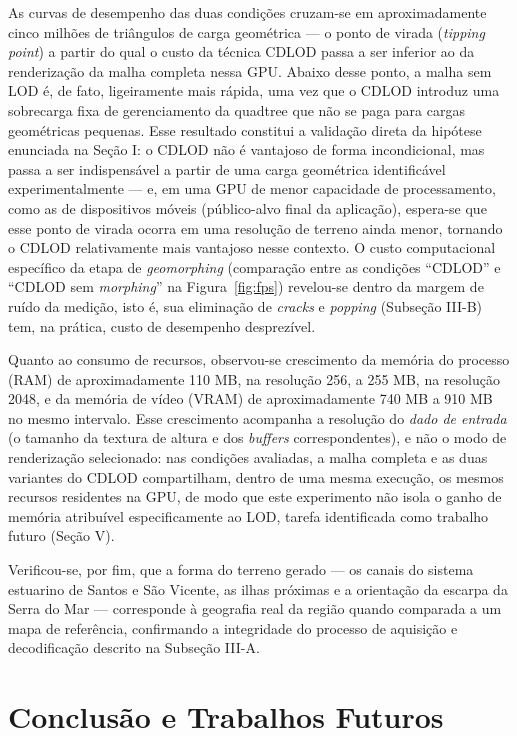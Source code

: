 \documentclass[conference]{IEEEtran}
\begin{document}
As curvas de desempenho das duas condições cruzam-se em aproximadamente
cinco milhões de triângulos de carga geométrica --- o ponto de virada
(\emph{tipping point}) a partir do qual o custo da técnica CDLOD passa a
ser inferior ao da renderização da malha completa nessa GPU. Abaixo desse
ponto, a malha sem LOD é, de fato, ligeiramente mais rápida, uma vez que
o CDLOD introduz uma sobrecarga fixa de gerenciamento da quadtree que não
se paga para cargas geométricas pequenas. Esse resultado constitui a
validação direta da hipótese enunciada na Seção I: o CDLOD não é
vantajoso de forma incondicional, mas passa a ser indispensável a partir
de uma carga geométrica identificável experimentalmente --- e, em uma GPU
de menor capacidade de processamento, como as de dispositivos móveis
(público-alvo final da aplicação), espera-se que esse ponto de virada
ocorra em uma resolução de terreno ainda menor, tornando o CDLOD
relativamente mais vantajoso nesse contexto. O custo computacional
específico da etapa de \emph{geomorphing} (comparação entre as condições
``CDLOD'' e ``CDLOD sem \emph{morphing}'' na Figura~\ref{fig:fps})
revelou-se dentro da margem de ruído da medição, isto é, sua eliminação
de \emph{cracks} e \emph{popping} (Subseção III-B) tem, na prática, custo
de desempenho desprezível.

Quanto ao consumo de recursos, observou-se crescimento da memória do
processo (RAM) de aproximadamente 110 MB, na resolução 256, a 255 MB, na
resolução 2048, e da memória de vídeo (VRAM) de aproximadamente 740 MB a
910 MB no mesmo intervalo. Esse crescimento acompanha a resolução do
\emph{dado de entrada} (o tamanho da textura de altura e dos
\emph{buffers} correspondentes), e não o modo de renderização
selecionado: nas condições avaliadas, a malha completa e as duas
variantes do CDLOD compartilham, dentro de uma mesma execução, os
mesmos recursos residentes na GPU, de modo que este experimento não
isola o ganho de memória atribuível especificamente ao LOD, tarefa
identificada como trabalho futuro (Seção V).

Verificou-se, por fim, que a forma do terreno gerado --- os canais do
sistema estuarino de Santos e São Vicente, as ilhas próximas e a
orientação da escarpa da Serra do Mar --- corresponde à geografia real da
região quando comparada a um mapa de referência, confirmando a
integridade do processo de aquisição e decodificação descrito na
Subseção III-A.

\section{Conclusão e Trabalhos Futuros}
\end{document}
